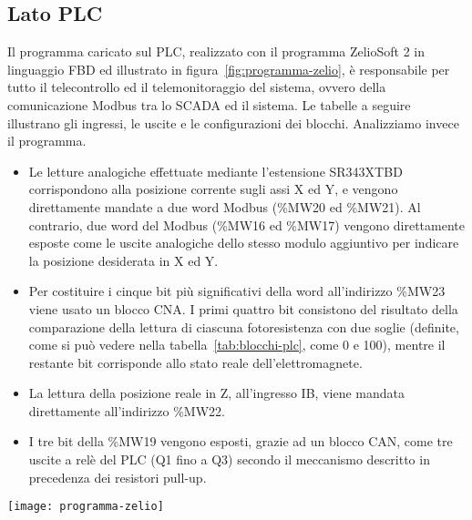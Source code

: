 \subsection{Lato PLC}

Il programma caricato sul PLC, realizzato con il programma ZelioSoft 2 in linguaggio FBD ed
illustrato in figura~\ref{fig:programma-zelio}, è responsabile per tutto il telecontrollo ed il
telemonitoraggio del sistema, ovvero della comunicazione Modbus tra lo SCADA ed il sistema. Le
tabelle a seguire illustrano gli ingressi, le uscite e le configurazioni dei blocchi. Analizziamo
invece il programma.
\begin{itemize}
    \item Le letture analogiche effettuate mediante l'estensione SR343XTBD corrispondono alla
        posizione corrente sugli assi X ed Y, e vengono direttamente mandate a due word Modbus
        (\%MW20 ed \%MW21). Al contrario, due word del Modbus (\%MW16 ed \%MW17) vengono
        direttamente esposte come le uscite analogiche dello stesso modulo aggiuntivo per indicare
        la posizione desiderata in X ed Y.
    \item Per costituire i cinque bit più significativi della word all'indirizzo \%MW23 viene usato
        un blocco CNA. I primi quattro bit consistono del risultato della comparazione della lettura
        di ciascuna fotoresistenza con due soglie (definite, come si può vedere nella
        tabella~\ref{tab:blocchi-plc}, come 0 e 100), mentre il restante bit corrisponde allo stato
        reale dell'elettromagnete.
    \item La lettura della posizione reale in Z, all'ingresso IB, viene mandata direttamente
        all'indirizzo \%MW22.
    \item I tre bit della \%MW19 vengono esposti, grazie ad un blocco CAN, come tre uscite a relè
        del PLC (Q1 fino a Q3) secondo il meccanismo descritto in precedenza dei resistori pull-up.
\end{itemize}

\begin{figure*}[htbp]\centering
    \caption{Il programma caricato nel PLC.}\label{fig:programma-zelio}
    \texttt{[image: programma-zelio]}
\end{figure*}

